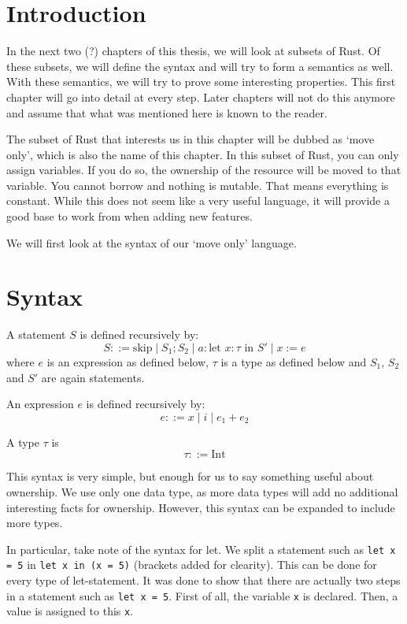 \section{Introduction}
In the next two (?) chapters of this thesis, we will look at subsets of Rust. Of these subsets, we will define the syntax and will try to form a semantics as well. With these semantics, we will try to prove some interesting properties. This first chapter will go into detail at every step. Later chapters will not do this anymore and assume that what was mentioned here is known to the reader.

The subset of Rust that interests us in this chapter will be dubbed as `move only', which is also the name of this chapter. In this subset of Rust, you can only assign variables. If you do so, the ownership of the resource will be moved to that variable. You cannot borrow and nothing is mutable. That means everything is constant. While this does not seem like a very useful language, it will provide a good base to work from when adding new features.

We will first look at the syntax of our `move only' language.

\section{Syntax}
\begin{definition}
A statement $S$ is defined recursively by:
$$S ::= \textrm{skip} \mid S_1; S_2 \mid a: \textrm{let } x:\tau \textrm{ in } S' \mid x := e$$
where $e$ is an expression as defined below, $\tau$ is a type as defined below and $S_1$, $S_2$ and $S'$ are again statements.
\end{definition}

\begin{definition}
An expression $e$ is defined recursively by:
$$e ::= x \mid i \mid e_1 + e_2$$
\end{definition}

\begin{definition}
A type $\tau$ is
$$\tau ::= \textrm{Int}$$
\end{definition}

This syntax is very simple, but enough for us to say something useful about ownership. We use only one data type, as more data types will add no additional interesting facts for ownership. However, this syntax can be expanded to include more types. 

In particular, take note of the syntax for let. We split a statement such as \verb|let x = 5| in \verb|let x in (x = 5)| (brackets added for clearity). This can be done for every type of let-statement. It was done to show that there are actually two steps in a statement such as \verb|let x = 5|. First of all, the variable \verb|x| is declared. Then, a value is assigned to this \verb|x|. 

